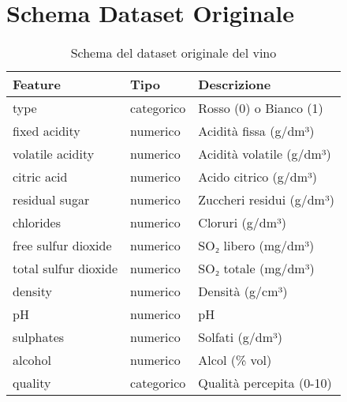 \documentclass[a4paper, 12pt]{article}
\begin{document}
\section{Schema Dataset Originale}
\begin{table}[h]
\centering
\begin{tabular}{l l l}
\toprule
\textbf{Feature} & \textbf{Tipo} & \textbf{Descrizione} \\
\midrule
type & categorico & Rosso (0) o Bianco (1) \\
fixed acidity & numerico & Acidità fissa (g/dm³) \\
volatile acidity & numerico & Acidità volatile (g/dm³) \\
citric acid & numerico & Acido citrico (g/dm³) \\
residual sugar & numerico & Zuccheri residui (g/dm³) \\
chlorides & numerico & Cloruri (g/dm³) \\
free sulfur dioxide & numerico & SO₂ libero (mg/dm³) \\
total sulfur dioxide & numerico & SO₂ totale (mg/dm³) \\
density & numerico & Densità (g/cm³) \\
pH & numerico & pH \\
sulphates & numerico & Solfati (g/dm³) \\
alcohol & numerico & Alcol (\% vol) \\
quality & categorico & Qualità percepita (0-10) \\
\bottomrule
\end{tabular}
\caption{Schema del dataset originale del vino}
\label{tab:wine_schema}
\end{table}
\end{document}
